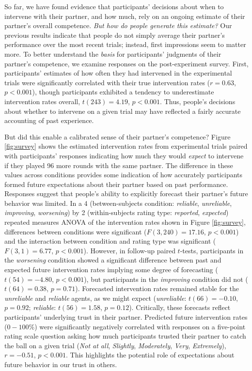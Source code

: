 \documentclass[10pt,letterpaper]{article}
\begin{document}
So far, we have found evidence that participants' decisions about when to intervene with their partner, and how much, rely on an ongoing estimate of their partner's overall competence. \textit{But how do people generate this estimate?} Our previous results indicate that people do not simply average their partner's performance over the most recent trials; instead, first impressions seem to matter more. To better understand the \textit{basis} for participants' judgments of their partner's competence, we examine responses on the post-experiment survey. First, participants' estimates of how often they had intervened in the experimental trials were significantly correlated with their true intervention rates ($r = 0.63$, $p < 0.001$), though participants exhibited a tendency to underestimate intervention rates overall, $t(243) = 4.19$, $p < 0.001$. Thus, people's decisions about whether to intervene on a given trial may have reflected a fairly accurate accounting of past experience. 

But did this enable a calibrated sense of their partner's competence? Figure \ref{fig:survey} shows the estimated intervention rates from experimental trials paired with participants' responses indicating how much they would \textit{expect} to intervene if they played 96 more rounds with the same partner. The difference in these values across conditions provides some indication of how accurately participants formed future expectations about their partner based on past performance. Responses suggest that people's ability to explicitly forecast their partner's future behavior was limited. In a 4 (between-subjects condition: \textit{reliable}, \textit{unreliable}, \textit{improving}, \textit{worsening}) by 2 (within-subjects rating type: \textit{reported}, \textit{expected}) repeated measures ANOVA of the intervention rates shown in Figure \ref{fig:survey}, differences between conditions were significant ($F(3, 240) = 17.16$, $p < 0.001$) and the interaction between condition and rating type was significant ($F(3, 1) = 6.77$, $p < 0.001$). However, in follow-up paired $t$-tests, participants in the \textit{worsening} condition showed a significant difference between past and expected future intervention rates implying some degree of forecasting ($t(54) = -4.80$, $p < 0.001$), but participants in the \textit{improving} condition did not ($t(64) = 0.38$, $p = 0.71$). Forecasted intervention rates remained stable for the \textit{unreliable} and \textit{reliable} agents, as we might expect (\textit{unreliable}: $t(66) = -0.10$, $p = 0.92$; \textit{reliable}: $t(56) = 1.58$, $p = 0.12$). 
Critically, these forecasts reflect participants' underlying trust in their partner. Predicted future intervention rates ($0-100\%$) were significantly negatively correlated with responses on a five-point rating scale question asking how much participants trusted their partner to catch the ball on a given trial (\textit{Not at all}, \textit{Slightly}, \textit{Moderately}, \textit{Very}, \textit{Extremely}), $r = -0.51$, $p < 0.001$. This highlights the potential role of expectations about future behavior in our trust in others.
\end{document}
